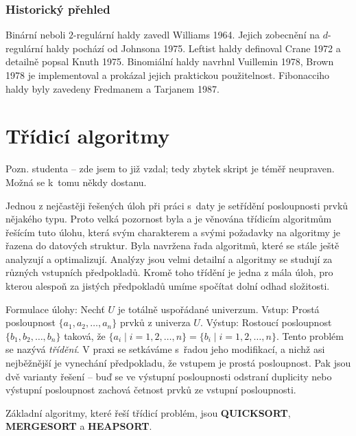 \documentclass[a4paper,12pt]{article}
\begin{document}
\subsubsection{Historický přehled}

Binární neboli $2$-regulární haldy 
zavedl Williams 1964.  Jejich zobecnění na $d$-regulární haldy 
pochází od Johnsona 1975.  Leftist haldy definoval Crane 1972 a 
detailně popsal Knuth 1975.  Binomiální haldy navrhnl Vuillemin 
1978, Brown 1978 je implementoval a prokázal jejich praktickou 
použitelnost.  Fibonacciho haldy byly zavedeny Fredmanem a 
Tarjanem 1987.  

\section{{Třídicí algoritmy}}

Pozn. studenta -- zde jsem to již vzdal; tedy zbytek skript je téměř neupraven. Možná se k~tomu někdy dostanu.

Jednou z nejčastěji řešených úloh při práci s~daty je setřídění 
posloupnosti prvků nějakého typu. Proto velká pozornost byla a je věnována 
třídicím algoritmům řešícím tuto úlohu, která 
svým charakterem a svými 
požadavky na algoritmy je řazena do datových 
struktur. Byla navržena řada algoritmů, které se 
stále ještě analyzují a optimalizují. Analýzy jsou velmi detailní a algoritmy se 
studují za různých vstupních předpokladů. 
Kromě toho třídění je jedna z mála úloh, pro kterou 
alespoň za jistých 
předpokladů umíme spočítat dolní odhad složitosti.

Formulace úlohy:\newline 
Nechť $U$ je totálně uspořádané univerzum.\newline 
Vstup: Prostá posloupnost $\{a_1,a_2,\dots,a_n\}$ prvků z 
univerza $U$.\newline 
Výstup: Rostoucí posloupnost $\{b_1,b_2,\dots,b_n\}$ taková, že 
$\{a_i\mid i=1,2,\dots,n\}=\{b_i\mid i=1,2,\dots,n\}$.\newline 
Tento problém se nazývá \emph{třídění}. 
V praxi se setkáváme s~řadou jeho modifikací, a nichž 
asi nejběžnější je vynechání předpokladu, že 
vstupem je prostá posloupnost. Pak jsou dvě varianty 
řešení -- buď se ve výstupní posloupnosti odstraní 
duplicity nebo výstupní posloupnost zachová četnost prvků ze 
vstupní posloupnosti.

Základní algoritmy, které  řeší třídicí 
problém, jsou {\bf QUICKSORT}, {\bf MERGESORT} a {\bf HEAP\-SORT}. 
\end{document}
